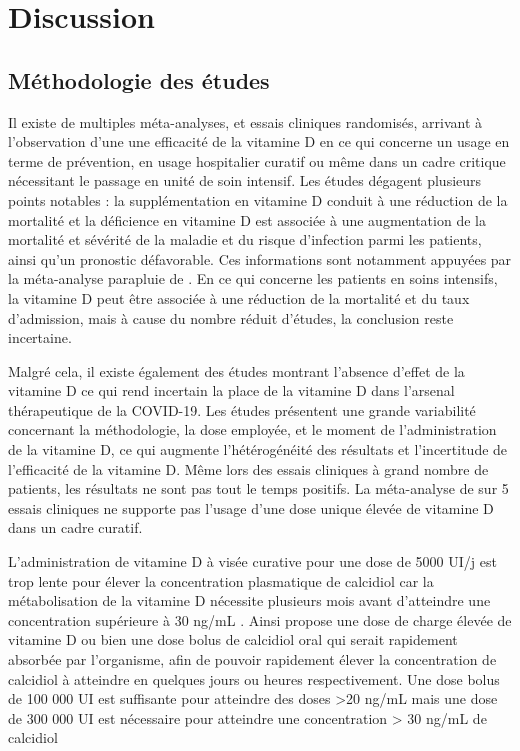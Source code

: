 \documentclass[
  a4paper,
  DIV=11,
  numbers=noendperiod,
  listof=totoc]{scrreprt}
\begin{document}
\section{Discussion}\label{discussion}

\subsection{Méthodologie des
études}\label{muxe9thodologie-des-uxe9tudes}

Il existe de multiples méta-analyses, et essais cliniques randomisés,
arrivant à l'observation d'une une efficacité de la vitamine D en ce qui
concerne un usage en terme de prévention, en usage hospitalier curatif
ou même dans un cadre critique nécessitant le passage en unité de soin
intensif. Les études dégagent plusieurs points notables : la
supplémentation en vitamine D conduit à une réduction de la mortalité et
la déficience en vitamine D est associée à une augmentation de la
mortalité et sévérité de la maladie et du risque d'infection parmi les
patients, ainsi qu'un pronostic défavorable. Ces informations sont
notamment appuyées par la méta-analyse parapluie de
\textcite{Jamilian.2024}. En ce qui concerne les patients en soins
intensifs, la vitamine D peut être associée à une réduction de la
mortalité et du taux d'admission, mais à cause du nombre réduit
d'études, la conclusion reste incertaine.

Malgré cela, il existe également des études montrant l'absence d'effet
de la vitamine D ce qui rend incertain la place de la vitamine D dans
l'arsenal thérapeutique de la COVID-19. Les études présentent une grande
variabilité concernant la méthodologie, la dose employée, et le moment
de l'administration de la vitamine D, ce qui augmente l'hétérogénéité
des résultats et l'incertitude de l'efficacité de la vitamine D. Même
lors des essais cliniques à grand nombre de patients, les résultats ne
sont pas tout le temps positifs. La méta-analyse de
\textcite{Zhong.2024} sur 5 essais cliniques ne supporte pas l'usage
d'une dose unique élevée de vitamine D dans un cadre curatif.

L'administration de vitamine D à visée curative pour une dose de 5000
UI/j est trop lente pour élever la concentration plasmatique de
calcidiol car la métabolisation de la vitamine D nécessite plusieurs
mois avant d'atteindre une concentration supérieure à 30 ng/mL
\autocite{Mocanu.2009}. Ainsi \textcite{Wimalawansa.2022} propose une
dose de charge élevée de vitamine D ou bien une dose bolus de calcidiol
oral qui serait rapidement absorbée par l'organisme, afin de pouvoir
rapidement élever la concentration de calcidiol à atteindre en quelques
jours ou heures respectivement. Une dose bolus de 100 000 UI est
suffisante pour atteindre des doses \textgreater20 ng/mL mais une dose
de 300 000 UI est nécessaire pour atteindre une concentration
\textgreater{} 30 ng/mL de calcidiol \autocite{Kearns.2014}
\end{document}

